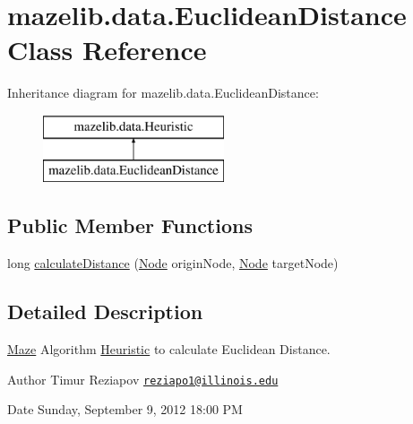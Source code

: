 \hypertarget{classmazelib_1_1data_1_1_euclidean_distance}{\section{mazelib.\-data.\-Euclidean\-Distance Class Reference}
\label{classmazelib_1_1data_1_1_euclidean_distance}
}
Inheritance diagram for mazelib.\-data.\-Euclidean\-Distance\-:\begin{figure}[H]
\begin{center}
\leavevmode
\includegraphics[height=2.000000cm]{classmazelib_1_1data_1_1_euclidean_distance}
\end{center}
\end{figure}
\subsection*{Public Member Functions}
\begin{DoxyCompactItemize}
\item 
long \hyperlink{classmazelib_1_1data_1_1_euclidean_distance_ad25a60eeb1a8bbe3d7c428d125e02320}{calculate\-Distance} (\hyperlink{classmazelib_1_1data_1_1_node}{Node} origin\-Node, \hyperlink{classmazelib_1_1data_1_1_node}{Node} target\-Node)
\end{DoxyCompactItemize}


\subsection{Detailed Description}
\hyperlink{classmazelib_1_1data_1_1_maze}{Maze} Algorithm \hyperlink{interfacemazelib_1_1data_1_1_heuristic}{Heuristic} to calculate Euclidean Distance. \begin{DoxyAuthor}{Author}
Timur Reziapov \href{mailto:reziapo1@illinois.edu}{\tt reziapo1@illinois.\-edu} 
\end{DoxyAuthor}
\begin{DoxyDate}{Date}
Sunday, September 9, 2012 18\-:00 P\-M 
\end{DoxyDate}


